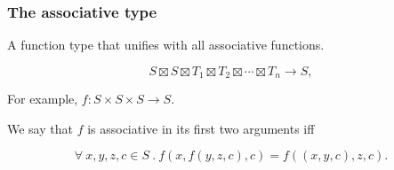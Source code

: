 \begin{frame}[plain]

\frametitle{The associative type}

A function type that unifies with all associative functions.

\[S \boxtimes S \boxtimes T_1 \boxtimes T_2 \boxtimes \cdots \boxtimes T_n
\rightarrow S, \]

For example, $f:S \times S \times S \rightarrow S$.

We say that $f$ is associative in its first two arguments iff

\[\forall\ x,y,z,c\in S\ .\ f\left(x,f\left(y,z,c\right),c\right) =
f\left(\left( x, y, c\right), z, c\right).\]

\end{frame}
